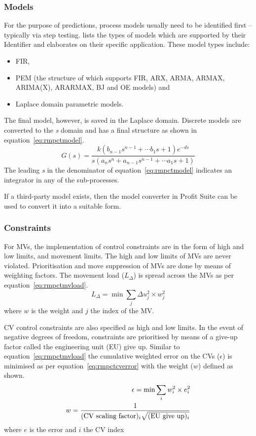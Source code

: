 \subsubsection{Models}
For the purpose of predictions, process models usually need to be identified first -- typically via step testing.
\citet{honeywell3} lists the types of models which are supported by their Identifier and elaborates on their specific application.
These model types include:
\begin{itemize}
\item FIR,
\item PEM (the structure of which supports FIR, ARX, ARMA, ARMAX, ARIMA(X), ARARMAX, BJ and OE models) and
\item Laplace domain parametric models.
\end{itemize}
The final model, however, is saved in the Laplace domain.
Discrete models are converted to the {\it s} domain and has a final structure as shown in equation~\ref{eq:rmpctmodel}.
\begin{equation}
  \label{eq:rmpctmodel}
  G(s) = \frac{k(b_{n-1}s^{n-1}+ \cdots b_1s+1)e^{-ds}} {s(a_ns^n+a_{n-1}s^{n-1}+ \cdots a_1s+1)}
\end{equation}
The leading {\it s} in the denominator of equation~\ref{eq:rmpctmodel} indicates an integrator in any of the sub-processes.

If a third-party model exists, then the model converter in Profit Suite can be used to convert it into a suitable form.
  
\subsubsection{Constraints}\label{sec:rmpctcons}
For MVs, the implementation of control constraints are in the form of high and low limits, and movement limits.
The high and low limits of MVs are never violated.
Prioritisation and move suppression of MVs are done by means of weighting factors.
The movement load ($L_{\Delta}$) is spread across the MVs as per equation~\ref{eq:rmpctmvload}.
\begin{equation}
  \label{eq:rmpctmvload}
  L_{\Delta} = \min \sum_j \Delta u_j^2 \times w_j^2
\end{equation}
where $w$ is the weight and $j$ the index of the MV.

CV control constraints are also specified as high and low limits.
In the event of negative degrees of freedom, constraints are prioritised by means of a give-up factor called the engineering unit (EU) give up.
Similar to equation~\ref{eq:rmpctmvload} the cumulative weighted error on the CVs ($\epsilon$) is minimised as per equation~\ref{eq:rmpctcverror} with the weight ($w$) defined as shown.
\begin{align}
  \label{eq:rmpctcverror}
  \epsilon = \min \sum_i w_i^2 \times e_i^2 \\
  w = \frac{1}{(\text{CV scaling factor})_i\sqrt{(\text{EU give up})_i}} \notag
\end{align}
where $e$ is the error and $i$ the CV index

